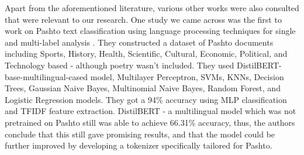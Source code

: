 Apart from the aforementioned literature, various other works were also consulted that were relevant to our research. One study we came across was the first to work on Pashto text classification using language processing techniques for single and multi-label analysis \cite{pashto_text_classification}. They constructed a dataset of Pashto documents including Sports, History, Health, Scientific, Cultural, Economic, Political, and Technology based - although poetry wasn't included. They used DistilBERT-base-multilingual-cased model, Multilayer Perceptron, SVMs, KNNs, Decision Trees, Gaussian Naive Bayes, Multinomial Naive Bayes, Random Forest, and Logistic Regression models. They got a 94\% accuracy using MLP classification and TFIDF feature extraction. DistilBERT - a multilingual model which was not pretrained on Pashto still was able to achieve 66.31\% accuracy, thus, the authors conclude that this still gave promising results, and that the model could be further improved by developing a tokenizer specifically tailored for Pashto.   